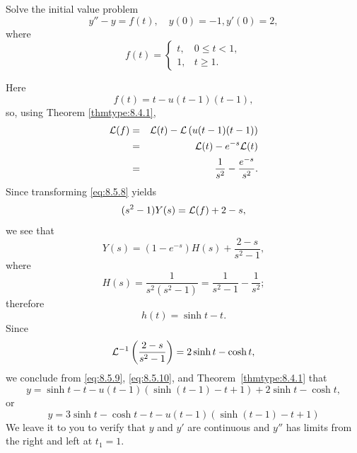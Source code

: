 \documentclass{ximera}
\begin{document}
\begin{example}\label{example:8.5.3}
Solve the initial value problem
\begin{equation}\label{eq:8.5.8}
y''-y=f(t), \quad   y(0)=-1,  y'(0)=2,
\end{equation}
where
$$
f(t)=\left\{\begin{array}{cl}
t,&0\leq t<1,\\
1,&t\geq 1.
\end{array}\right.
$$
\begin{explanation}
Here
$$
f(t)=t-u(t-1)(t-1),
$$
so, using Theorem \ref{thmtype:8.4.1},
\begin{eqnarray*}
{\cal L}(f)&=&{\cal L}(t)-{\cal L}\left(u(t-1)(t-1)\right)\\
&=&{\cal L}(t)-e^{-s}{\cal L}(t)\\
&=&\frac{1}{s^2}-\frac{e^{-s}}{s^2}.
\end{eqnarray*}
Since transforming  \eqref{eq:8.5.8} yields
$$
(s^2-1) Y(s)={\cal L}(f)+2-s,
$$
we see that
\begin{equation}\label{eq:8.5.9}
Y(s)=(1-e^{-s})H(s)+\frac{2-s}{s^2-1},
\end{equation}
where
$$
H(s)=\frac{1}{s^2(s^2-1)}=\frac{1}{s^2-1}-\frac{1}{s^2};
$$
 therefore
\begin{equation}\label{eq:8.5.10}
h(t)=\sinh t-t.
\end{equation}
Since
$$
{\cal L}^{-1}\left(\frac{2-s}{s^2-1}\right)=2\sinh t-\cosh t,
$$
we conclude from  \eqref{eq:8.5.9},  \eqref{eq:8.5.10}, and
Theorem~\ref{thmtype:8.4.1} that
$$
y=\sinh t-t-u(t-1)\left(\sinh (t-1)-t+1\right)+2\sinh t-
\cosh t,
$$
or
\begin{equation}\label{eq:8.5.11}
y=3\sinh t-\cosh t-t-u(t-1)\left(\sinh (t-1)-t+1\right)
\end{equation}
We leave it to you to verify that $y$  and $y'$ are continuous and
$y''$ has limits from the right and left at
$t_1=1$.
\end{explanation}
\end{example}
\end{document}
